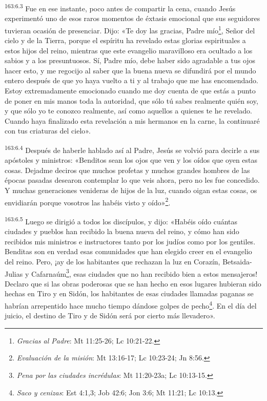 \par
\textsuperscript{163:6.3} Fue en ese instante, poco antes de compartir la cena, cuando Jesús experimentó uno de esos raros momentos de éxtasis emocional que sus seguidores tuvieran ocasión de presenciar. Dijo: «Te doy las gracias, Padre mío\footnote{\textit{Gracias al Padre}: Mt 11:25-26; Lc 10:21-22.}, Señor del cielo y de la Tierra, porque el espíritu ha revelado estas glorias espirituales a estos hijos del reino, mientras que este evangelio maravilloso era ocultado a los sabios y a los presuntuosos. Sí, Padre mío, debe haber sido agradable a tus ojos hacer esto, y me regocijo al saber que la buena nueva se difundirá por el mundo entero después de que yo haya vuelto a ti y al trabajo que me has encomendado. Estoy extremadamente emocionado cuando me doy cuenta de que estás a punto de poner en mis manos toda la autoridad, que sólo tú sabes realmente quién soy, y que sólo yo te conozco realmente, así como aquellos a quienes te he revelado. Cuando haya finalizado esta revelación a mis hermanos en la carne, la continuaré con tus criaturas del cielo».

\par
\textsuperscript{163:6.4} Después de haberle hablado así al Padre, Jesús se volvió para decirle a sus apóstoles y ministros: «Benditos sean los ojos que ven y los oídos que oyen estas cosas. Dejadme deciros que muchos profetas y muchos grandes hombres de las épocas pasadas desearon contemplar lo que veis ahora, pero no les fue concedido. Y muchas generaciones venideras de hijos de la luz, cuando oigan estas cosas, os envidiarán porque vosotros las habéis visto y oído»\footnote{\textit{Evaluación de la misión}: Mt 13:16-17; Lc 10:23-24; Jn 8:56.}.

\par
\textsuperscript{163:6.5} Luego se dirigió a todos los discípulos, y dijo: «Habéis oído cuántas ciudades y pueblos han recibido la buena nueva del reino, y cómo han sido recibidos mis ministros e instructores tanto por los judíos como por los gentiles. Benditas son en verdad esas comunidades que han elegido creer en el evangelio del reino. Pero, ¡ay de los habitantes que rechazan la luz en Corazín, Betsaida-Julias y Cafarnaúm\footnote{\textit{Pena por las ciudades incrédulas}: Mt 11:20-23a; Lc 10:13-15.}, esas ciudades que no han recibido bien a estos mensajeros! Declaro que si las obras poderosas que se han hecho en esos lugares hubieran sido hechas en Tiro y en Sidón, los habitantes de esas ciudades llamadas paganas se habrían arrepentido hace mucho tiempo dándose golpes de pecho\footnote{\textit{Saco y cenizas}: Est 4:1,3; Job 42:6; Jon 3:6; Mt 11:21; Lc 10:13.}. En el día del juicio, el destino de Tiro y de Sidón será por cierto más llevadero».

